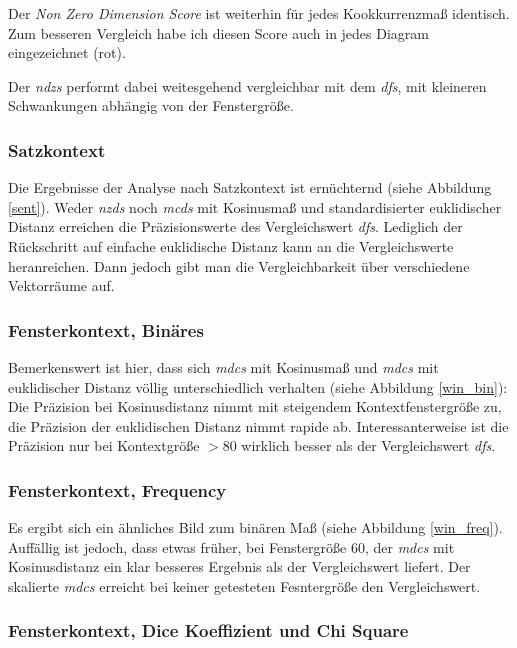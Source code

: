 \documentclass[11pt,numbers=noenddot]{scrartcl}
\begin{document}
Der \emph{Non Zero Dimension Score} ist weiterhin für jedes Kookkurrenzmaß identisch. Zum besseren Vergleich habe ich diesen Score auch in jedes Diagram eingezeichnet (rot).

Der \emph{ndzs} performt dabei weitesgehend vergleichbar mit dem \emph{dfs}, mit kleineren Schwankungen abhängig von der Fenstergröße.

\subsubsection {Satzkontext}

Die Ergebnisse der Analyse nach Satzkontext ist ernüchternd (siehe Abbildung \ref{sent}). Weder \emph{nzds} noch \emph{mcds} mit Kosinusmaß und standardisierter euklidischer Distanz erreichen die Präzisionswerte des Vergleichswert \emph{dfs}. Lediglich der Rückschritt auf einfache euklidische Distanz kann an die Vergleichswerte heranreichen. Dann jedoch gibt man die Vergleichbarkeit über verschiedene Vektorräume auf.


\subsubsection{Fensterkontext, Binäres}

Bemerkenswert ist hier, dass sich \emph{mdcs} mit Kosinusmaß und \emph{mdcs} mit euklidischer Distanz völlig unterschiedlich verhalten (siehe Abbildung \ref{win_bin}): Die Präzision bei Kosinusdistanz nimmt mit steigendem Kontextfenstergröße zu, die Präzision der euklidischen Distanz nimmt rapide ab. Interessanterweise ist die Präzision nur bei Kontextgröße $>80$ wirklich besser als der Vergleichswert \emph{dfs}.


\subsubsection{Fensterkontext, Frequency}

Es ergibt sich ein ähnliches Bild zum binären Maß (siehe Abbildung \ref{win_freq}). Auffällig ist jedoch, dass etwas früher, bei Fenstergröße 60, der \emph{mdcs} mit Kosinusdistanz ein klar besseres Ergebnis als der Vergleichswert liefert. Der skalierte \emph{mdcs} erreicht bei keiner getesteten Fesntergröße den Vergleichswert.

\subsubsection{Fensterkontext, Dice Koeffizient und Chi Square}
\end{document}
